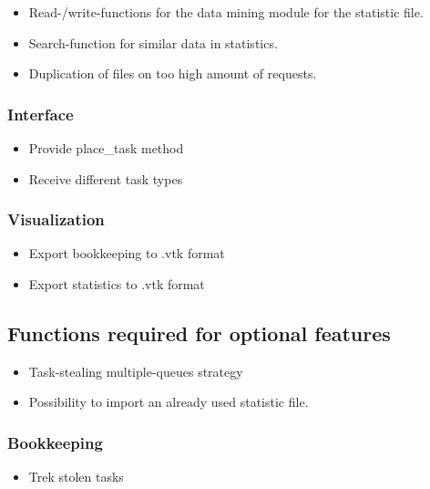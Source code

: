 {			%
			\begin{itemize}
				
				\item Read-/write-functions for the data mining module for the statistic file.
				\item Search-function for similar data in statistics.
				\item Duplication of files on too high amount of requests.
			\end{itemize}
	
	
	\subsubsection{Interface}
	
		\begin{itemize}
			\item Provide place_task method
			\item Receive different task types
		\end{itemize}
		
		
	\subsubsection{Visualization}
	
		\begin{itemize}
			\item Export bookkeeping to .vtk format
			\item Export statistics to .vtk format
		\end{itemize}
		
	\subsection{Functions required for optional features}
	
		\begin{itemize}
			\item Task-stealing multiple-queues strategy%
			\item Possibility to import an already used statistic file.%
		\end{itemize}
		
	\subsubsection{Bookkeeping}
		\begin{itemize}
			\item Trek stolen tasks
		\end{itemize}
		
}
